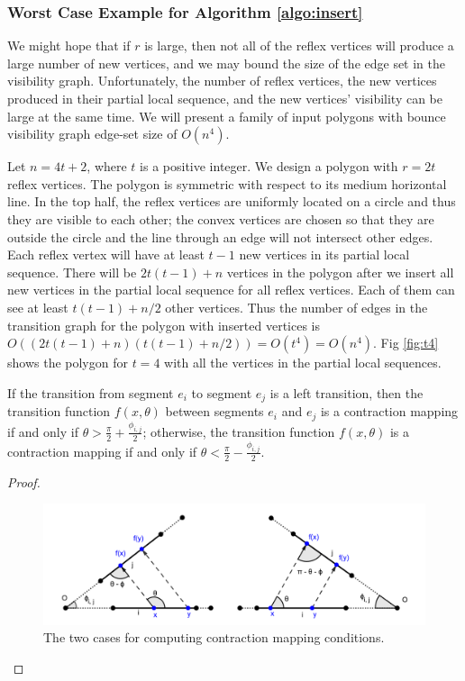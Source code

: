 \documentclass[]{styles/svproc}  %
\begin{document}
\begin{appendix}

\subsubsection{Worst Case Example for Algorithm \ref{algo:insert}}

We might hope that if $r$ is large, then not all of the reflex vertices will
produce a large number of new vertices, and we may bound the size of the edge
set in the visibility graph. Unfortunately, the number of reflex
vertices, the new vertices produced in their partial local sequence, and the new
vertices' visibility can be large at the same time. We will present a family of
input polygons with bounce visibility graph edge-set size of $O(n^4)$.

Let $n = 4t+2$, where $t$ is a positive integer. We design a polygon with
$r = 2t$ reflex vertices. The polygon is symmetric with respect to its medium
horizontal line. In the top half, the reflex vertices are uniformly located on a
circle and thus they are visible to each other; the convex vertices are chosen
so that they are outside the circle and the line through an edge will not
intersect other edges. Each reflex vertex will have at least $t-1$ new
vertices in its partial local sequence. There will be $2t(t-1)+n$
vertices in the polygon after we insert all new vertices in the partial local
sequence for all reflex vertices. Each of them can see at least $t(t-1)+n/2$
other vertices. Thus the number of edges in the transition graph for the
polygon with inserted vertices is
$O ((2t(t-1)+n)(t(t-1)+n/2)) = O(t^4) = O(n^4)$.
Fig \ref{fig:t4} shows the polygon for $t = 4$ with all the
vertices in the partial local sequences. %

\begin{lemma} \label{lemma:angrange}
If the transition from segment $e_i$ to segment $e_j$ is a left transition, then the
transition function $f(x, \theta)$ between segments $e_i$ and $e_j$ is a contraction
mapping if and only if $\theta > \frac{\pi}{2}+\frac{\phi_{i, j}}{2}$;
otherwise, the transition function $f(x, \theta)$ is a contraction mapping if
and only if $\theta < \frac{\pi}{2}-\frac{\phi_{i, j}}{2}$.
\end{lemma}
\begin{proof}

\begin{figure}
    \includegraphics[width=1\linewidth]{figures/contraction_map_cond.png}
    \centering
    \caption{The two cases for computing contraction mapping conditions. \label{fig:cont_map}}
    \centering
\end{figure}


\end{proof}
\end{appendix}
\end{document}
